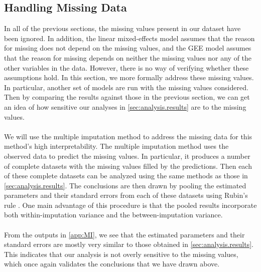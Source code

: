 \subsection{Handling Missing Data} \label{sec:handling.missing.data}
In all of the previous sections, the missing values present in our dataset have been ignored. In addition, the linear mixed-effects model assumes that the reason for missing does not depend on the missing values, and the GEE model assumes that the reason for missing depends on neither the missing values nor any of the other variables in the data. However, there is no way of verifying whether these assumptions hold. In this section, we more formally address these missing values. In particular, another set of models are run with the missing values considered. Then by comparing the results against those in the previous section, we can get an idea of how sensitive our analyses in \cref{sec:analysis.results} are to the missing values.\\\\
We will use the multiple imputation method to address the missing data for this method's high interpretability. The multiple imputation method uses the observed data to predict the missing values. In particular, it produces a number of complete datasets with the missing values filled by the predictions. Then each of these complete datasets can be analyzed using the same methods as those in \cref{sec:analysis.results}. The conclusions are then drawn by pooling the estimated parameters and their standard errors from each of these datasets using Rubin's rule \cite{little2019statistical}. One main advantage of this procedure is that the pooled results incorporate both within-imputation variance and the between-imputation variance.\\\\
From the outputs in \cref{app:MI}, we see that the estimated parameters and their standard errors are mostly very similar to those obtained in \cref{sec:analysis.results}. This indicates that our analysis is not overly sensitive to the missing values, which once again validates the conclusions that we have drawn above.